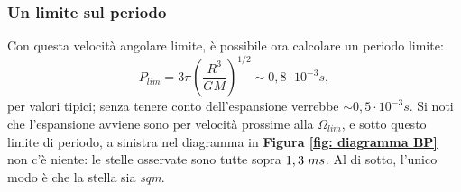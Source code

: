 \subsubsection{Un limite sul periodo}
Con questa velocità angolare limite, è possibile ora calcolare un periodo limite:
\begin{equation}
    P_{lim} = 3\pi\left( \frac{R^3}{GM} \right)^{1/2}\sim 0,8\cdot10^{-3}s,
\end{equation}
per valori tipici; senza tenere conto dell'espansione verrebbe $\sim0,5\cdot10^{-3}s$.
Si noti che l'espansione avviene sono per velocità prossime alla $\Omega_{lim}$, e sotto questo limite di periodo, a sinistra nel diagramma in \textbf{Figura \ref{fig: diagramma BP}} non c'è niente: le stelle osservate sono tutte sopra $1,3\hspace{1mm}ms$.
Al di sotto, l'unico modo è che la stella sia \textit{sqm}.

